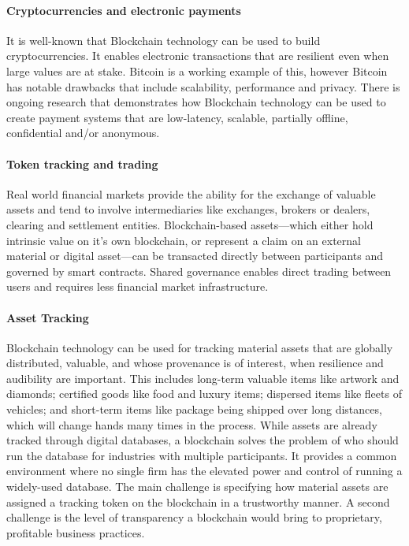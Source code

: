\paragraph{Cryptocurrencies and electronic payments}
It is well-known that Blockchain technology can be used to build cryptocurrencies. 
It enables electronic transactions that are resilient even when large values are at stake.
Bitcoin is a working example of this, however Bitcoin has notable drawbacks that include scalability, performance and privacy.
There is ongoing research that demonstrates how Blockchain technology can be used to create payment systems that are low-latency, scalable, partially offline, confidential and/or anonymous.

\paragraph{Token tracking and trading}
Real world financial markets provide the ability for the exchange of valuable assets and tend to involve intermediaries like exchanges, brokers or dealers, clearing and settlement entities. 
Blockchain-based assets---which either hold intrinsic value on it's own blockchain, or represent a claim on an external material or digital asset---can be transacted directly between participants and governed by smart contracts.
Shared governance enables direct trading between users and requires less financial market infrastructure.

\paragraph{Asset Tracking} 
Blockchain technology can be used for tracking material assets that are globally distributed, valuable, and whose provenance is of interest, when resilience and audibility are important. This includes long-term valuable items like artwork and diamonds; certified goods like food and luxury items; dispersed items like fleets of vehicles; and short-term items like package being shipped over long distances, which will change hands many times in the process. While assets are already tracked through digital databases, a blockchain solves the problem of who should run the database for industries with multiple participants. It provides a common environment where no single firm has the elevated power and control of running a widely-used database. The main challenge is specifying how material assets are assigned a tracking token on the blockchain in a trustworthy manner. A second challenge is the level of transparency a blockchain would bring to proprietary, profitable business practices.

